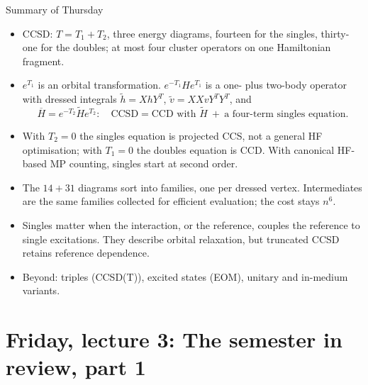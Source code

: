 \documentclass[aspectratio=169,10pt]{beamer}
\newcommand{\Hbar}{\overline{H}}
\begin{document}
\begin{frame}{Summary of Thursday}
\begin{itemize}
\item CCSD: $T=T_1+T_2$, three energy diagrams, fourteen for the singles, thirty-one for the doubles; at most four cluster operators on one Hamiltonian fragment.
\item $e^{T_1}$ is an orbital transformation. $e^{-T_1}He^{T_1}$ is a one- plus two-body operator with dressed integrals $\tilde h=XhY^{T}$, $\tilde v=XXvY^{T}Y^{T}$, and
\[
 \Hbar=e^{-T_2}\tilde He^{T_2}:\quad\text{CCSD}=\text{CCD with }\tilde H\ +\ \text{a four-term singles equation}.
\]
\item With $T_2=0$ the singles equation is projected CCS, not a general HF optimisation; with $T_1=0$ the doubles equation is CCD. With canonical HF-based MP counting, singles start at second order.
\item The $14+31$ diagrams sort into families, one per dressed vertex. Intermediates are the same families collected for efficient evaluation; the cost stays $n^6$.
\item Singles matter when the interaction, or the reference, couples the reference to single excitations. They describe orbital relaxation, but truncated CCSD retains reference dependence.
\item Beyond: triples (CCSD(T)), excited states (EOM), unitary and in-medium variants.
\end{itemize}
\end{frame}

\section[Friday 3: Review, part 1]{Friday, lecture 3: The semester in review, part 1}
\end{document}
